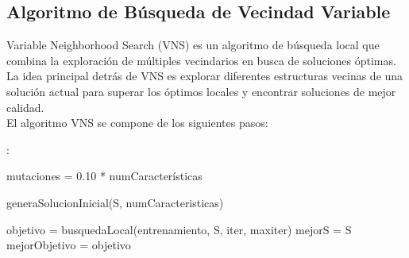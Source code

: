 \subsection{Algoritmo de Búsqueda de Vecindad Variable}
Variable Neighborhood Search (VNS) es un algoritmo de búsqueda local que combina la exploración de múltiples vecindarios en busca de soluciones óptimas. La idea principal detrás de VNS es explorar diferentes estructuras vecinas de una solución actual para superar los óptimos locales y encontrar soluciones de mejor calidad.\\

El algoritmo VNS se compone de los siguientes pasos:\\
\begin{algorithm}[H]
	
	
	\BlankLine
	:
	\BlankLine	
	
	mutaciones = 0.10 * numCaracterísticas\\
	
	generaSolucionInicial(S, numCaracteristicas)
	
	objetivo = busquedaLocal(entrenamiento, S, iter, maxiter)
	\BlankLine
	mejorS = S\\
	mejorObjetivo = objetivo\\
	
	\;
\end{algorithm}

